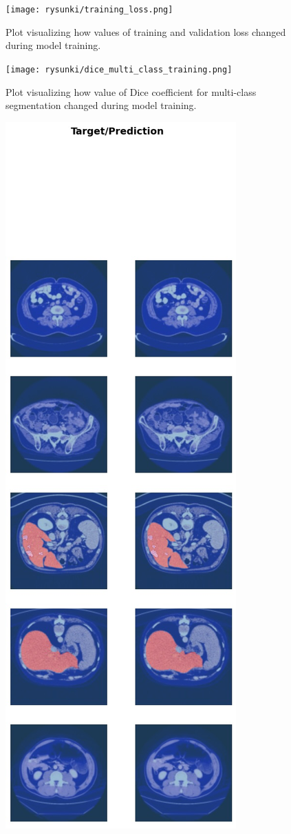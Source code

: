 \begin{figure}[!h]
	\centering \texttt{[image: rysunki/training\_loss.png]}
	\caption{Plot visualizing how values of training and validation loss changed during model training.}
	\label{rys:plot_loss}
\end{figure}

\begin{figure}[H]
	\centering \texttt{[image: rysunki/dice\_multi\_class\_training.png]}
	\caption{Plot visualizing how value of Dice coefficient for multi-class segmentation changed during model training.}
	\label{rys:dice_training}
\end{figure}

\begin{figure}[H]
	\centering \includegraphics[scale=0.5]{rysunki/predykcje_modelu.jpeg}

\end{figure}
